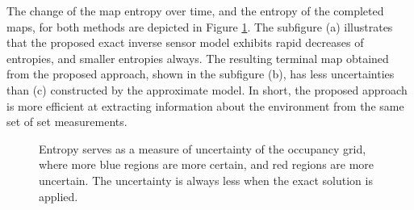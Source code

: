 \documentclass[letterpaper, 10pt, conference]{ieeeconf}
\begin{document}
The change of the map entropy over time, and the entropy of the completed maps, for both methods are depicted in Figure \ref{fig:NumResOccH}. The subfigure (a) illustrates that the proposed exact inverse sensor model exhibits rapid decreases of entropies, and smaller entropies always. The resulting terminal map obtained from the proposed approach, shown in the subfigure (b), has less uncertainties than (c) constructed by the approximate model. In short, the proposed approach is more efficient at extracting information about the environment from the same set of set measurements. 



\begin{figure}
\centerline{
}
\centerline{
}
\caption{Entropy serves as a measure of uncertainty of the occupancy grid, where more blue regions are more certain, and red regions are more uncertain. The uncertainty is always less when the exact solution is applied.}\label{fig:NumResOccH}
\end{figure}
\end{document}
